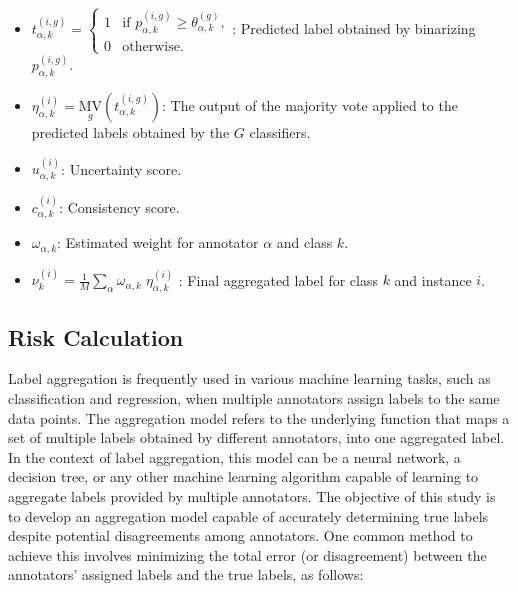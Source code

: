 \documentclass[pdflatex,bst/sn-basic]{bst/sn-jnl}%
\begin{document}
\begin{itemize}
    \item  $t_{\alpha,k}^{(i,g)} =
        \begin{cases}
            1 & \text{if } p_{\alpha,k}^{(i,g)} \geq \theta_{\alpha,k}^{(g)}, \\
            0 & \text{otherwise}.
        \end{cases} $: Predicted label obtained by binarizing $p_{\alpha,k}^{(i,g)} $.

    \item  $\eta_{\alpha,k}^{(i)} = {{\underset g{\mathrm{MV}}}{ \left(t_{\alpha,k}^{(i,g)}\right) }} $: The output of the majority vote applied to the predicted labels obtained by the $G $ classifiers.

    \item  $u_{\alpha,k}^{(i)} $: Uncertainty score.

    \item  $c_{\alpha,k}^{(i)} $: Consistency score.

    \item  $\omega_{\alpha,k} $: Estimated weight for annotator $\alpha $ and class $k $.

    \item  $\nu_k^{(i)}=\frac{1}{{M}}{\sum_{\alpha}{\omega_{\alpha,k} \; \eta_{\alpha,k}^{(i)}}} $ : Final aggregated label for class $k $ and instance $i $.

\end{itemize}

\subsection{Risk Calculation}

Label aggregation is frequently used in various machine learning tasks, such as classification and regression, when multiple annotators assign labels to the same data points. The aggregation model refers to the underlying function that maps a set of multiple labels obtained by different annotators, into one aggregated label. In the context of label aggregation, this model can be a neural network, a decision tree, or any other machine learning algorithm capable of learning to aggregate labels provided by multiple annotators. The objective of this study is to develop an aggregation model capable of accurately determining true labels despite potential disagreements among annotators. One common method to achieve this involves minimizing the total error (or disagreement) between the annotators' assigned labels and the true labels, as follows:
\end{document}
